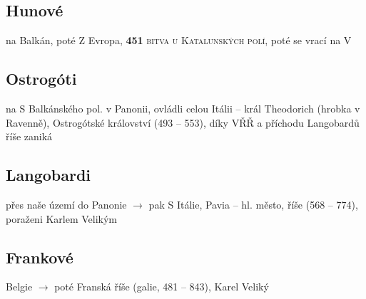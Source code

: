\documentclass{article}
\begin{document}
\subsection*{Hunové}
    na Balkán, poté Z Evropa, \textbf{451} \textsc{bitva u Katalunských polí}, poté se vrací na V

\subsection*{Ostrogóti}
    na S Balkánského pol. v Panonii, ovládli celou Itálii -- král Theodorich (hrobka v Ravenně), Ostrogótské království (493 -- 553), díky VŘŘ a příchodu Langobardů říše zaniká

\subsection*{Langobardi}
    přes naše území do Panonie $\rightarrow$ pak S Itálie, Pavia -- hl. město, říše (568 -- 774), poraženi Karlem Velikým

\subsection*{Frankové}
    Belgie $\rightarrow$ poté Franská říše (galie, 481 -- 843), Karel Veliký
\end{document}

